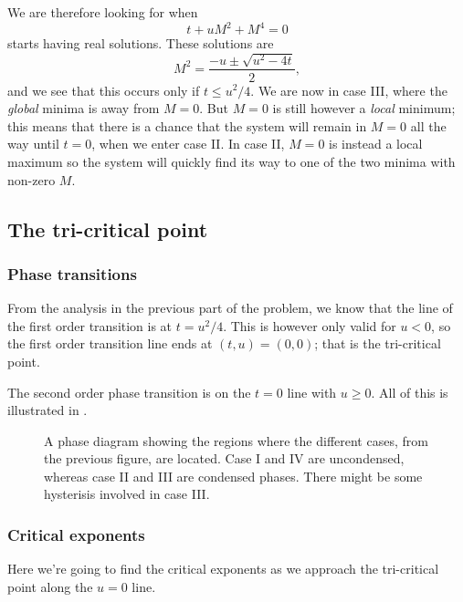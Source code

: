 \documentclass[11pt,letter, swedish, english
]{article}
\newcommand{\Tc}{\ensuremath{T_{\text{c}}}}
\begin{document}
We are therefore looking for when
\begin{equation}
t+uM^2+M^4=0
\end{equation}
starts having real solutions. These solutions are
\begin{equation}
M^2=\frac{-u\pm\sqrt{u^2-4t}}{2},
\end{equation}
and we see that this occurs only if $t\le u^2/4$. We are now in case
III, where the \emph{global} minima is away from $M=0$. But $M=0$ is
still however a \emph{local} minimum; this means that there is a
chance that the system will remain in $M=0$ all the way until $t=0$,
when we enter case II. In case II, $M=0$ is instead a local maximum so the
system will quickly find its way to one of the two minima with
non-zero $M$. 



\subsection{The tri-critical point}

\subsubsection{Phase transitions}
From the analysis in the previous part of the problem, we know that
the line of the first order transition is at $t=u^2/4$. This is
however only valid for $u<0$, so the first order transition line ends
at $(t, u)=(0, 0)$; that is the tri-critical point.

The second order phase transition is on the $t=0$ line with
$u\ge0$. All of this is illustrated in .

\begin{figure}\centering

\caption{A phase diagram showing the regions where the different
  cases, from the previous figure, are located. Case I and IV are 
  uncondensed, whereas case II and III are condensed phases. There
  might be some hysterisis involved in case III. }
\label{fig:2_phase}
\end{figure}

\subsubsection{Critical exponents}
Here we're going to find the critical exponents as we approach the
tri-critical point along the $u=0$ line. 
\end{document}
